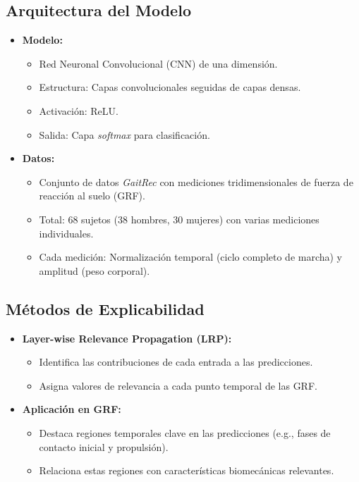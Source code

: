 \documentclass{report}
\begin{document}
\subsection{Arquitectura del Modelo}
\begin{itemize}
    \item \textbf{Modelo:} 
    \begin{itemize}
        \item Red Neuronal Convolucional (CNN) de una dimensión.
        \item Estructura: Capas convolucionales seguidas de capas densas.
        \item Activación: ReLU.
        \item Salida: Capa \textit{softmax} para clasificación.
    \end{itemize}
    \item \textbf{Datos:}
    \begin{itemize}
        \item Conjunto de datos \textit{GaitRec} con mediciones tridimensionales de fuerza de reacción al suelo (GRF).
        \item Total: 68 sujetos (38 hombres, 30 mujeres) con varias mediciones individuales.
        \item Cada medición: Normalización temporal (ciclo completo de marcha) y amplitud (peso corporal).
    \end{itemize}
\end{itemize}

\subsection{Métodos de Explicabilidad}
\begin{itemize}
    \item \textbf{Layer-wise Relevance Propagation (LRP):}
    \begin{itemize}
        \item Identifica las contribuciones de cada entrada a las predicciones.
        \item Asigna valores de relevancia a cada punto temporal de las GRF.
    \end{itemize}
    \item \textbf{Aplicación en GRF:}
    \begin{itemize}
        \item Destaca regiones temporales clave en las predicciones (e.g., fases de contacto inicial y propulsión).
        \item Relaciona estas regiones con características biomecánicas relevantes.
    \end{itemize}
\end{itemize}
\end{document}
